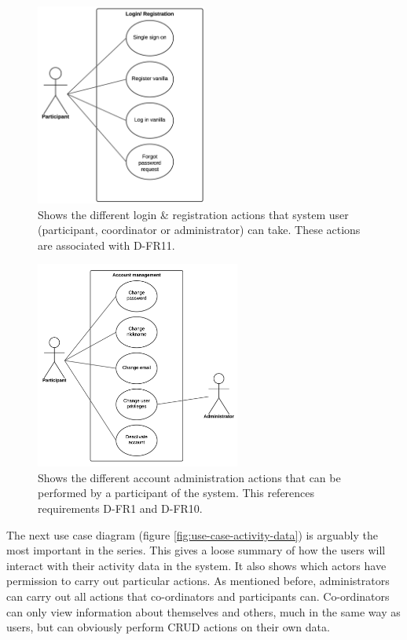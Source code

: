 \begin{figure}[H]
\centering
\includegraphics[width=0.5\textwidth]{../design/UML/UseCase/Login-Register.png}
\caption{Shows the different login \& registration actions that system user (participant, coordinator or administrator) can take. These actions are associated with D-FR11.}
\label{fig:use-case-login}
\end{figure}

\begin{figure}[H]
\centering
\includegraphics[width=0.6\textwidth]{../design/UML/UseCase/Account-Management.png}
\caption{Shows the different account administration actions that can be performed by a participant of the system. This references requirements D-FR1 and D-FR10.}
\label{fig:use-case-account-admin}
\end{figure}

The next use case diagram (figure \ref{fig:use-case-activity-data}) is arguably the most important in the series. This gives a loose summary of how the users will interact with their activity data in the system. It also shows which actors have permission to carry out particular actions. As mentioned before, administrators can carry out all actions that co-ordinators and participants can. Co-ordinators can only view information about themselves and others, much in the same way as users, but can obviously perform CRUD actions on their own data.

